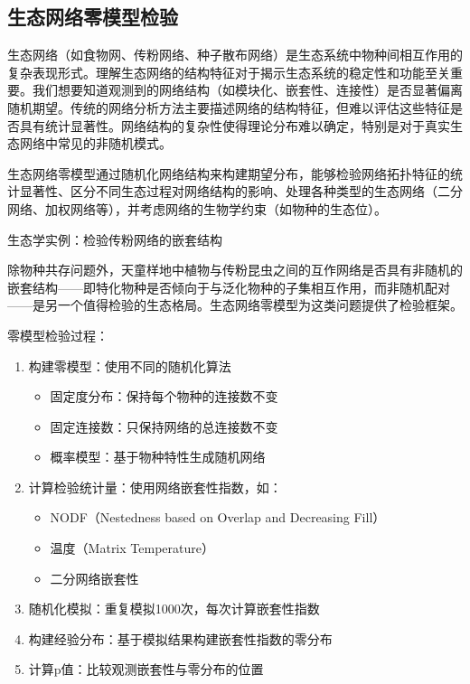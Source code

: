 \documentclass[
  twoside,12pt,fontset=none]{ctexbook}
\providecommand{\tightlist}{%
  \setlength{\itemsep}{0pt}\setlength{\parskip}{0pt}}
\begin{document}
\hypertarget{ux751fux6001ux7f51ux7edcux96f6ux6a21ux578bux68c0ux9a8c}{%
\subsection{生态网络零模型检验}\label{ux751fux6001ux7f51ux7edcux96f6ux6a21ux578bux68c0ux9a8c}}

生态网络（如食物网、传粉网络、种子散布网络）是生态系统中物种间相互作用的复杂表现形式。理解生态网络的结构特征对于揭示生态系统的稳定性和功能至关重要。我们想要知道观测到的网络结构（如模块化、嵌套性、连接性）是否显著偏离随机期望。传统的网络分析方法主要描述网络的结构特征，但难以评估这些特征是否具有统计显著性。网络结构的复杂性使得理论分布难以确定，特别是对于真实生态网络中常见的非随机模式。

生态网络零模型通过随机化网络结构来构建期望分布，能够检验网络拓扑特征的统计显著性、区分不同生态过程对网络结构的影响、处理各种类型的生态网络（二分网络、加权网络等），并考虑网络的生物学约束（如物种的生态位）。

生态学实例：检验传粉网络的嵌套结构

除物种共存问题外，天童样地中植物与传粉昆虫之间的互作网络是否具有非随机的嵌套结构------即特化物种是否倾向于与泛化物种的子集相互作用，而非随机配对------是另一个值得检验的生态格局。生态网络零模型为这类问题提供了检验框架。

零模型检验过程：

\begin{enumerate}
\def\labelenumi{\arabic{enumi}.}
\item
  构建零模型：使用不同的随机化算法

  \begin{itemize}
  \tightlist
  \item
    固定度分布：保持每个物种的连接数不变
  \item
    固定连接数：只保持网络的总连接数不变
  \item
    概率模型：基于物种特性生成随机网络
  \end{itemize}
\item
  计算检验统计量：使用网络嵌套性指数，如：

  \begin{itemize}
  \tightlist
  \item
    NODF（Nestedness based on Overlap and Decreasing Fill）
  \item
    温度（Matrix Temperature）
  \item
    二分网络嵌套性
  \end{itemize}
\item
  随机化模拟：重复模拟1000次，每次计算嵌套性指数
\item
  构建经验分布：基于模拟结果构建嵌套性指数的零分布
\item
  计算p值：比较观测嵌套性与零分布的位置
\end{enumerate}
\end{document}
